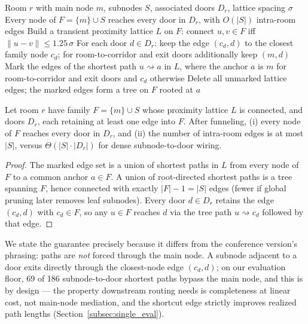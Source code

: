 \documentclass[manuscript,screen,review]{acmart}
\begin{document}
\begin{algorithm}[t]
\caption{Room-Family Funneling}
\label{alg:funneling}
\begin{algorithmic}[1]
\REQUIRE Room $r$ with main node $m$, subnodes $S$, associated doors $D_r$, lattice spacing $\sigma$
\ENSURE Every node of $F = \{m\} \cup S$ reaches every door in $D_r$, with $O(|S|)$ intra-room edges
\STATE Build a transient proximity lattice $L$ on $F$: connect $u, v \in F$ iff $\|u - v\| \le 1.25\,\sigma$
\STATE For each door $d \in D_r$: keep the edge $(c_d, d)$ to the closest family node $c_d$; for room-to-corridor and exit doors additionally keep $(m, d)$
    \STATE Mark the edges of the shortest path $u \rightsquigarrow a$ in $L$, where the anchor $a$ is $m$ for room-to-corridor and exit doors and $c_d$ otherwise
\ENDFOR
\STATE Delete all unmarked lattice edges; the marked edges form a tree on $F$ rooted at $a$
\end{algorithmic}
\end{algorithm}

\begin{proposition}
\label{prop:funneling}
Let room $r$ have family $F = \{m\} \cup S$ whose proximity lattice $L$ is connected, and doors $D_r$, each retaining at least one edge into $F$. After funneling, (i) every node of $F$ reaches every door in $D_r$, and (ii) the number of intra-room edges is at most $|S|$, versus $\Theta(|S| \cdot |D_r|)$ for dense subnode-to-door wiring.
\end{proposition}

\begin{proof}
The marked edge set is a union of shortest paths in $L$ from every node of $F$ to a common anchor $a \in F$. A union of root-directed shortest paths is a tree spanning $F$, hence connected with exactly $|F| - 1 = |S|$ edges (fewer if global pruning later removes leaf subnodes). Every door $d \in D_r$ retains the edge $(c_d, d)$ with $c_d \in F$, so any $u \in F$ reaches $d$ via the tree path $u \rightsquigarrow c_d$ followed by that edge.
\end{proof}

We state the guarantee precisely because it differs from the conference version's phrasing: paths are \emph{not} forced through the main node. A subnode adjacent to a door exits directly through the closest-node edge $(c_d, d)$; on our evaluation floor, 69 of 186 subnode-to-door shortest paths bypass the main node, and this is by design --- the property downstream routing needs is completeness at linear cost, not main-node mediation, and the shortcut edge strictly improves realized path lengths (Section~\ref{subsec:single_eval}).
\end{document}
